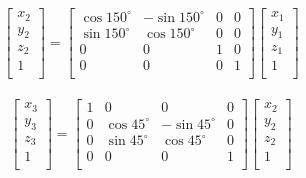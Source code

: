 \documentclass[a4paper,10pt]{jsarticle}
\begin{document}
\begin{eqnarray}
\label{eq:e}
  \left[
    \begin{array}{c}
      x_2\\
      y_2\\
      z_2\\
      1\\
    \end{array}
  \right] =
  \left[
    \begin{array}{cccc}
      \cos{150^\circ} & -\sin{150^\circ} & 0 & 0 \\
      \sin{150^\circ} & \cos{150^\circ} & 0 & 0\\
      0 & 0 & 1 & 0\\
      0 & 0 & 0 & 1\\
    \end{array}
  \right]\left[
    \begin{array}{c}
      x_1\\
      y_1\\
      z_1\\
      1\\
    \end{array}
  \right]
\end{eqnarray}

\begin{eqnarray}
\label{eq:f}
  \left[
    \begin{array}{c}
      x_3\\
      y_3\\
      z_3\\
      1\\
    \end{array}
  \right] =
  \left[
    \begin{array}{cccc}
      1 & 0 & 0 & 0 \\
      0 & \cos{45^\circ} & -\sin{45^\circ} & 0\\
      0 & \sin{45^\circ} & \cos{45^\circ} & 0\\
      0 & 0 & 0 & 1\\
    \end{array}
  \right]\left[
    \begin{array}{c}
      x_2\\
      y_2\\
      z_2\\
      1\\
    \end{array}
  \right]
\end{eqnarray}
\end{document}
